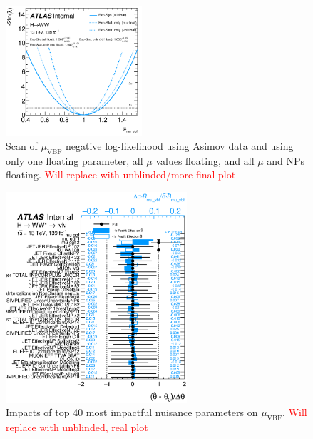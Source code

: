\begin{figure}[!h]
\centering
\includegraphics[width=0.45\textwidth]{Pictures/fitresults/afterfit.png}
\caption{Scan of $\mu_{\text{VBF}}$ negative log-likelihood using Asimov data and using only one floating parameter, all $\mu$ values floating, and all $\mu$ and NPs floating. \textcolor{red}{Will replace with unblinded/more final plot}}
\label{fig:scan}
\end{figure}

\begin{figure}[!h]
\centering
      \includegraphics[width=0.6\textwidth]{Pictures/fitresults/impact_asimov_mu_vbf.eps}
{\caption{Impacts of top 40 most impactful nuisance parameters on $\mu_{\text{VBF}}$. \textcolor{red}{Will replace with unblinded, real plot}
\label{fig:impacts}}}
\end{figure}


